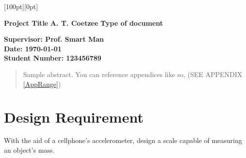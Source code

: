 \documentclass[11pt,peerreview]{IEEEtran}
\newlength{\PictHOffset}
\newlength{\PictVOffset}
\newcommand\tab[1][1cm]{\hspace*{#1}}
\begin{document}
 
\begin{titlepage}
    \noindent\hspace*{-\PictHOffset}%
    \raisebox{\PictVOffset}[100pt][0pt]{}

 
    \begin{center}
    	\vfill
        \Huge {\textbf{Project Title}}
    	\vfill
        \LARGE{\textbf{A. T. Coetzee}}
        \vfill
        \huge{\textbf{Type of document}}
        \vfill
    \end{center}
    \textbf{Supervisor: \tab[2cm] Prof. Smart Man}\\
    \textbf{Date: \tab[3cm] \today}\\
    \textbf{Student Number: \tab[1cm]  123456789}\\
    \vfill
\end{titlepage}


\pagebreak

\begin{abstract}
Sample abstract. You can reference appendices like so, (SEE APPENDIX \ref{AppRange}) 
\end{abstract}

\pagebreak

\tableofcontents

\listoffigures

\listoftables

\pagebreak

\setcounter{page}{1}

\section{Design Requirement}
With the aid of a cellphone's accelerometer, design a scale capable of measuring an object's mass.
\end{document}
